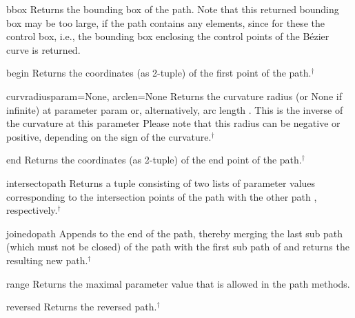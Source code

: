 \begin{methoddesc}{bbox}{}
  Returns the bounding box of the path. Note that this returned
  bounding box may be too large, if the path contains any
   elements, since for these the control box, i.e., the
  bounding box enclosing the control points of the B\'ezier curve is
  returned.
\end{methoddesc}

\begin{methoddesc}{begin}{}
  Returns the coordinates (as 2-tuple) of the first point of the path.$^\dagger$
\end{methoddesc}

\begin{methoddesc}{curvradius}{param=None, arclen=None}
  Returns the curvature radius (or None if infinite) at parameter
  param or, alternatively, arc length .  This is the
  inverse of the curvature at this parameter Please note that this
  radius can be negative or positive, depending on the sign of the
  curvature.$^\dagger$
\end{methoddesc}

\begin{methoddesc}{end}{}
  Returns the coordinates (as 2-tuple) of the end point of the path.$^\dagger$
\end{methoddesc}

\begin{methoddesc}{intersect}{opath}
  Returns a tuple consisting of two lists of parameter values
  corresponding to the intersection points of the path with the other
  path , respectively.$^\dagger$
\end{methoddesc}

\begin{methoddesc}{joined}{opath}
  Appends  to the end of the path, thereby merging the last
  sub path (which must not be closed) of the path with the first sub
  path of  and returns the resulting new path.$^\dagger$
\end{methoddesc}

\begin{methoddesc}{range}{}
  Returns the maximal parameter value  that is allowed in the
  path methods.
\end{methoddesc}

\begin{methoddesc}{reversed}{}
  Returns the reversed path.$^\dagger$
\end{methoddesc}


